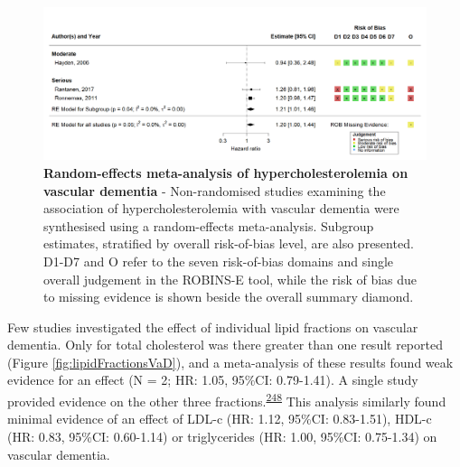 \documentclass[a4paper, twoside]{templates/ociamthesis}
\begin{document}
\begin{figure}[H]
\includegraphics[width=1\linewidth]{figures/sys-rev/fp_obs_hyperchol_VaD} \caption[Random-effects meta-analysis of hypercholesterolemia on vascular dementia]{\textbf{Random-effects meta-analysis of hypercholesterolemia on vascular dementia} - Non-randomised studies examining the association of hypercholesterolemia with vascular dementia were synthesised using a random-effects meta-analysis. Subgroup estimates, stratified by overall risk-of-bias level, are also presented. D1-D7 and O refer to the seven risk-of-bias domains and single overall judgement in the ROBINS-E tool, while the risk of bias due to missing evidence is shown beside the overall summary diamond.}\label{fig:obsHyperVaD}
\end{figure}

Few studies investigated the effect of individual lipid fractions on vascular dementia. Only for total cholesterol was there greater than one result reported (Figure \ref{fig:lipidFractionsVaD}), and a meta-analysis of these results found weak evidence for an effect (N = 2; HR: 1.05, 95\%CI: 0.79-1.41). A single study provided evidence on the other three fractions.\textsuperscript{\protect\hyperlink{ref-yoshitake1995}{248}} This analysis similarly found minimal evidence of an effect of LDL-c (HR: 1.12, 95\%CI: 0.83-1.51), HDL-c (HR: 0.83, 95\%CI: 0.60-1.14) or triglycerides (HR: 1.00, 95\%CI: 0.75-1.34) on vascular dementia.
\end{document}
